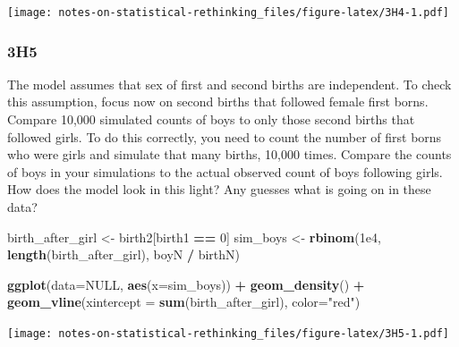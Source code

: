 \documentclass[
]{book}
\newenvironment{Shaded}{\begin{snugshade}}{\end{snugshade}}
\newcommand{\DataTypeTok}[1]{\textcolor[rgb]{0.13,0.29,0.53}{#1}}
\newcommand{\DecValTok}[1]{\textcolor[rgb]{0.00,0.00,0.81}{#1}}
\newcommand{\FloatTok}[1]{\textcolor[rgb]{0.00,0.00,0.81}{#1}}
\newcommand{\KeywordTok}[1]{\textcolor[rgb]{0.13,0.29,0.53}{\textbf{#1}}}
\newcommand{\NormalTok}[1]{#1}
\newcommand{\OperatorTok}[1]{\textcolor[rgb]{0.81,0.36,0.00}{\textbf{#1}}}
\newcommand{\OtherTok}[1]{\textcolor[rgb]{0.56,0.35,0.01}{#1}}
\newcommand{\StringTok}[1]{\textcolor[rgb]{0.31,0.60,0.02}{#1}}
\begin{document}
\texttt{[image: notes-on-statistical-rethinking\_files/figure-latex/3H4-1.pdf]}

\hypertarget{h5}{%
\subsubsection*{3H5}\label{h5}}

The model assumes that sex of first and second births are independent. To check this assumption, focus now on second births that followed female first borns. Compare 10,000 simulated counts of boys to only those second births that followed girls. To do this correctly, you need to count the number of first borns who were girls and simulate that many births, 10,000 times. Compare the counts of boys in your simulations to the actual observed count of boys following girls. How does the model look in this light? Any guesses what is going on in these data?

\begin{Shaded}
\begin{Highlighting}[]
\NormalTok{birth\_after\_girl \textless{}{-}}\StringTok{ }\NormalTok{birth2[birth1 }\OperatorTok{==}\StringTok{ }\DecValTok{0}\NormalTok{]}
\NormalTok{sim\_boys \textless{}{-}}\StringTok{ }\KeywordTok{rbinom}\NormalTok{(}\FloatTok{1e4}\NormalTok{, }\KeywordTok{length}\NormalTok{(birth\_after\_girl), boyN }\OperatorTok{/}\StringTok{ }\NormalTok{birthN)}

\KeywordTok{ggplot}\NormalTok{(}\DataTypeTok{data=}\OtherTok{NULL}\NormalTok{, }\KeywordTok{aes}\NormalTok{(}\DataTypeTok{x=}\NormalTok{sim\_boys)) }\OperatorTok{+}\StringTok{ }
\StringTok{  }\KeywordTok{geom\_density}\NormalTok{() }\OperatorTok{+}\StringTok{ }
\StringTok{  }\KeywordTok{geom\_vline}\NormalTok{(}\DataTypeTok{xintercept =} \KeywordTok{sum}\NormalTok{(birth\_after\_girl), }\DataTypeTok{color=}\StringTok{"red"}\NormalTok{)}
\end{Highlighting}
\end{Shaded}

\texttt{[image: notes-on-statistical-rethinking\_files/figure-latex/3H5-1.pdf]}

  
\end{document}
